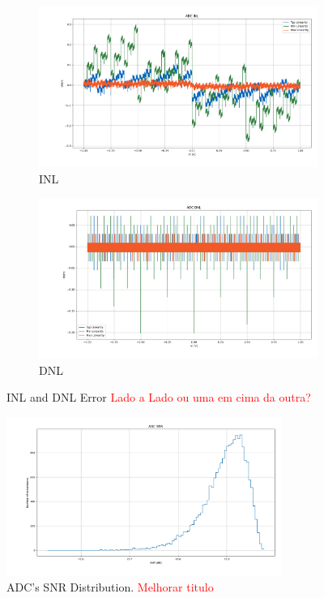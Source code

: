 \begin{figure}[H]
    \centering
    \begin{subfigure}[b]{0.8\textwidth}
        \centering
        \includegraphics[width=\textwidth]{Images/INL_All_Caps_20Ksim_s0011.png}
        \caption{INL}
        \label{fig:INL_ALLCAPS}
    \end{subfigure}%
    
    \begin{subfigure}[b]{0.8\textwidth}
        \centering
        \includegraphics[width=\textwidth]{Images/DNL_All_Caps_20Ksim_s0011.png}
        \caption{DNL}
        \label{fig:DNL_ALLCAPS}
    \end{subfigure}
    \caption{INL and DNL Error \textcolor{red}{Lado a Lado ou uma em cima da outra?}}
    \label{fig:NL_ALLCAPS}
\end{figure}

\begin{figure}[H]

    \centering
    \includegraphics*[width=0.8\textwidth]{Images/SNR_All_Caps_20Ksim_s0011.png}
    \caption{ADC's SNR Distribution. \textcolor{red}{Melhorar titulo}}
    \label{fig:ADC_SNR_ALLCAPS}
\end{figure}

